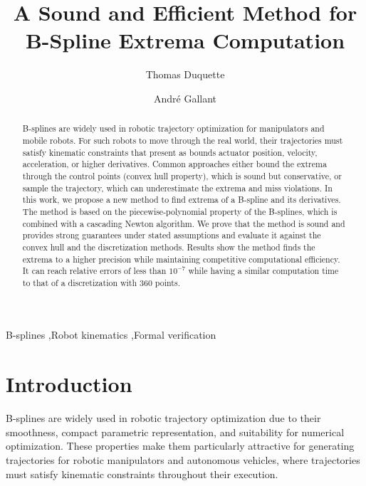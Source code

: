 \documentclass[final,5p,times,twocolumn]{elsarticle}
\title{A Sound and Efficient Method for B-Spline Extrema Computation}
\theoremstyle{definition}
\begin{document}
\begin{frontmatter}

\author[inst1]{Thomas Duquette}

\author[inst1]{André Gallant}



\begin{abstract}
B-splines are widely used in robotic trajectory optimization for manipulators and mobile robots. For such robots to move through the real world, their trajectories must satisfy kinematic constraints that present as bounds actuator position, velocity, acceleration, or higher derivatives.
Common approaches either bound the extrema through the control points (convex hull property), which is sound but conservative, or sample the trajectory, which can underestimate the extrema and miss violations. 
In this work, we propose a new method to find extrema of a B-spline and its derivatives. The method is based on the piecewise-polynomial property of the B-splines, which is combined with a cascading Newton algorithm. We prove that the method is sound and provides strong guarantees under stated assumptions and evaluate it against the convex hull and the discretization methods.
Results show the method finds the extrema to a higher precision while maintaining competitive computational efficiency. It can reach relative errors of less than $10^{-7}$ while having a similar computation time to that of a discretization with 360 points.


\end{abstract}

\begin{keyword}
B-splines \sep Robot kinematics \sep Formal verification
\end{keyword}
\end{frontmatter}


\section{Introduction}

B-splines are widely used in robotic trajectory optimization due to their smoothness, compact parametric representation, and suitability for numerical optimization. These properties make them particularly attractive for generating trajectories for robotic manipulators and autonomous vehicles, where trajectories must satisfy kinematic constraints throughout their execution.
\end{document}
